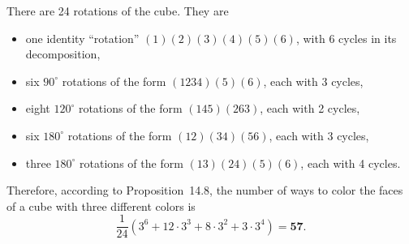 \documentclass[12pt,reqno]{amsart}
\newcommand{\<}{\ensuremath{\langle}}
\renewcommand{\>}{\ensuremath{\rangle}}
\begin{document}
\begin{enumerate}
\medskip

  There are 24 rotations of the cube.  They are
\begin{itemize}
\item one identity ``rotation'' $(1)(2)(3)(4)(5)(6)$, with 6 cycles in its decomposition,
\item six $90^\circ$ rotations of the form $(1234)(5)(6)$, each with 3 cycles,
\item eight $120^\circ$ rotations of the form $(145)(263)$, each with 2 cycles,
\item six $180^\circ$ rotations of the form $(12)(34)(56)$, each with 3 cycles,
\item three $180^\circ$ rotations of the form $(13)(24)(5)(6)$, each with 4 cycles.
\end{itemize}
Therefore, according to Proposition~14.8, the number of ways to color the faces
of a cube with three different colors is
\[
\frac{1}{24}(3^6 + 12\cdot 3^3 + 8\cdot 3^2 + 3\cdot 3^4) = \mathbf{57}.
\]
 
\end{enumerate}
\end{document}
